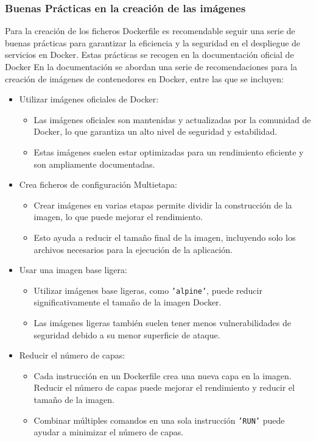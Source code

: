 \documentclass[12pt, a4paper, twoside]{article}
\begin{document}
\subsubsection{Buenas Prácticas en la creación de las imágenes}
Para la creación de los ficheros Dockerfile es recomendable seguir una serie de buenas prácticas para garantizar la eficiencia y la seguridad en el despliegue de servicios en Docker.
Estas prácticas se recogen en la documentación oficial de Docker \cite{dockerfile_best_practices}
En la documentación se abordan una serie de recomendaciones para la creación de imágenes de contenedores en Docker, entre las que se incluyen:
\begin{itemize}
    \item Utilizar imágenes oficiales de Docker:
    \begin{itemize}
        \item Las imágenes oficiales son mantenidas y actualizadas por la comunidad de Docker, lo que garantiza un alto nivel de seguridad y estabilidad.
        \item Estas imágenes suelen estar optimizadas para un rendimiento eficiente y son ampliamente documentadas.
    \end{itemize}
    
    \item Crea ficheros de configuración Multietapa:
    \begin{itemize}
        \item Crear imágenes en varias etapas permite dividir la construcción de la imagen, lo que puede mejorar el rendimiento.
        \item Esto ayuda a reducir el tamaño final de la imagen, incluyendo solo los archivos necesarios para la ejecución de la aplicación.
    \end{itemize}
    
    \item Usar una imagen base ligera:
    \begin{itemize}
        \item Utilizar imágenes base ligeras, como \texttt{'alpine'}, puede reducir significativamente el tamaño de la imagen Docker.
        \item Las imágenes ligeras también suelen tener menos vulnerabilidades de seguridad debido a su menor superficie de ataque.
    \end{itemize}
    
    \item Reducir el número de capas:
    \begin{itemize}
        \item Cada instrucción en un Dockerfile crea una nueva capa en la imagen. Reducir el número de capas puede mejorar el rendimiento y reducir el tamaño de la imagen.
        \item Combinar múltiples comandos en una sola instrucción \texttt{'RUN'} puede ayudar a minimizar el número de capas.
    \end{itemize}
    

\end{itemize}
\end{document}
